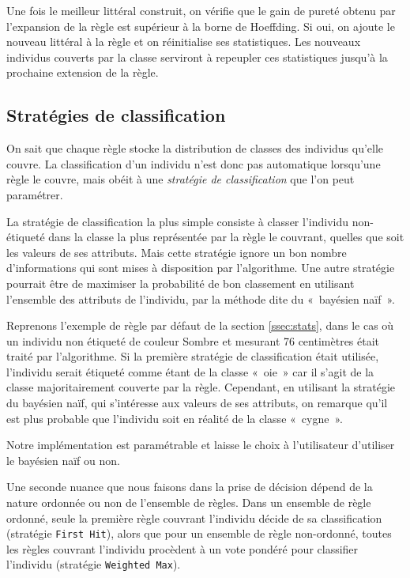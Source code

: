             Une fois le meilleur littéral construit, on vérifie que le gain de pureté obtenu par l'expansion de la règle est supérieur à la borne de Hoeffding. Si oui, on ajoute le nouveau littéral à la règle et on réinitialise ses statistiques. Les nouveaux individus couverts par la classe serviront à repeupler ces statistiques jusqu'à la prochaine extension de la règle.

        
        \subsection{Stratégies de classification}\label{ssec:nondecisional}
        
            On sait que chaque règle stocke la distribution de classes des individus qu'elle couvre. La classification d'un individu n'est donc pas automatique lorsqu'une règle le couvre, mais obéit à une \emph{stratégie de classification} que l'on peut paramétrer.

            La stratégie de classification la plus simple consiste à classer l’individu non-étiqueté dans la classe la plus représentée par la règle le couvrant, quelles que soit les valeurs de ses attributs. Mais cette stratégie ignore un bon nombre d’informations qui sont mises à disposition par l’algorithme. Une autre stratégie pourrait être de maximiser la probabilité de bon classement en utilisant l’ensemble des attributs de l’individu, par la méthode dite du «~bayésien naïf~».\cite{Gama-VFDR}
            
            Reprenons l’exemple de règle par défaut de la section \ref{ssec:stats}, dans le cas où un individu non étiqueté de couleur Sombre et mesurant 76 centimètres était traité par l’algorithme. Si la première stratégie de classification était utilisée, l’individu serait étiqueté comme étant de la classe «~oie~» car il s'agit de la classe majoritairement couverte par la règle. Cependant, en utilisant la stratégie du bayésien naïf, qui s'intéresse aux valeurs de ses attributs, on remarque qu’il est plus probable que l’individu soit en réalité de la classe «~cygne~». 

            Notre implémentation est paramétrable et laisse le choix à l'utilisateur d'utiliser le bayésien naïf ou non.

            Une seconde nuance que nous faisons dans la prise de décision dépend de la nature ordonnée ou non de l'ensemble de règles. Dans un ensemble de règle ordonné, seule la première règle couvrant l’individu décide de sa classification (stratégie \texttt{First Hit}), alors que pour un ensemble de règle non-ordonné, toutes les règles couvrant l’individu procèdent à un vote pondéré pour classifier l’individu (stratégie \texttt{Weighted Max}).





